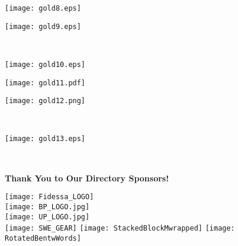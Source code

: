 \documentclass[twoside]{article}
\begin{document}
\begin{center}
        \hspace{1em}\begin{minipage}{0.3\textwidth}\begin{center}\texttt{[image: gold8.eps]}\vfill\end{center}\end{minipage}
        \hspace{1em}\begin{minipage}{0.3\textwidth}\begin{center}\texttt{[image: gold9.eps]}\vfill\end{center}\end{minipage}
        \\
            \begin{minipage}{0.3\textwidth}\begin{center}\texttt{[image: gold10.eps]}\vfill\end{center}\end{minipage}
        \hspace{1em}\begin{minipage}{0.3\textwidth}\begin{center}\texttt{[image: gold11.pdf]}\vfill\end{center}\end{minipage}
        \hspace{1em}\begin{minipage}{0.3\textwidth}\begin{center}\texttt{[image: gold12.png]}\vfill\end{center}\end{minipage}
        \\
            \begin{minipage}{0.3\textwidth}\begin{center}\texttt{[image: gold13.eps]}\vfill\end{center}\end{minipage}
        \\
            \end{center}
    \newpage
    \backcover
    { \fontsize{16}{19}\selectfont \bf Thank You to Our Directory Sponsors!}\\
    \begin{center}
    \vfill
    \texttt{[image: Fidessa\_LOGO]}\\[3em]
        \texttt{[image: BP\_LOGO.jpg]}\\[3em]
        \texttt{[image: UP\_LOGO.jpg]}\\[3em]
        \vfill
    \texttt{[image: SWE\_GEAR]}\hspace{3em}
    \texttt{[image: StackedBlockMwrapped]}\hspace{3em}
    \texttt{[image: RotatedBentwWords]}
    \end{center}
    
\end{document}
